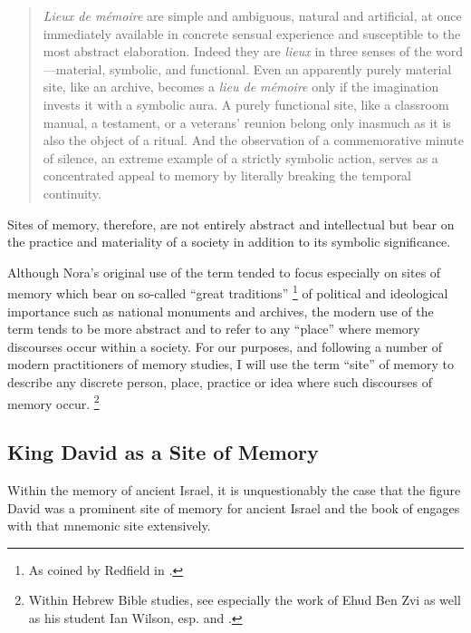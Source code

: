 \begin{quote}
    \emph{Lieux de mémoire} are simple and ambiguous, natural and artificial, at once immediately available in concrete sensual experience and susceptible to the most abstract elaboration. Indeed they are \emph{lieux} in three senses of the word---material, symbolic, and functional. Even an apparently purely material site, like an archive, becomes a \emph{lieu de mémoire} only if the imagination invests it with a symbolic aura. A purely functional site, like a classroom manual, a testament, or a veterans' reunion belong only inasmuch as it is also the object of a ritual. And the observation of a commemorative minute of silence, an extreme example of a strictly symbolic action, serves as a concentrated appeal to memory by literally breaking the temporal continuity.\autocite[18--19]{nora_representations1989}
\end{quote}

\noindent
Sites of memory, therefore, are not entirely abstract and intellectual but bear on the practice and materiality of a society in addition to its symbolic significance.

Although Nora's original use of the term tended to focus especially on sites of memory which bear on so-called ``great traditions''%
    \footnote{As coined by Redfield in \cite*[41--42]{redfield1956}.}
of political and ideological importance such as national monuments and archives, the modern use of the term tends to be more abstract and to refer to any ``place'' where memory discourses occur within a society. For our purposes, and following a number of modern practitioners of memory studies, I will use the term ``site'' of memory to describe any discrete person, place, practice or idea where such discourses of memory occur.%
    \footnote{Within Hebrew Bible studies, see especially the work of Ehud Ben Zvi as well as his student Ian Wilson, esp. \cite[72--74]{benzvi_st2017} and \cite[25--26]{wilson2017}.}




\subsection{King David as a Site of Memory}
Within the memory of ancient Israel, it is unquestionably the case that the figure David was a prominent site of memory for ancient Israel and the book of \chronicles engages with that mnemonic site extensively.

